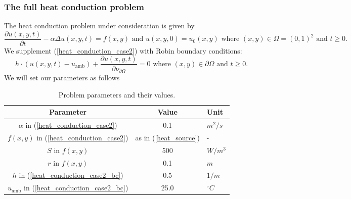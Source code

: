\documentclass[a4paper,11pt]{article}
\theoremstyle{plain} %
\theoremstyle{definition} %
\theoremstyle{remark} %
\theoremstyle{remark}
\def\uTemp{u}
\def\Laplace{\Delta}
\begin{document}
\subsubsection*{The full heat conduction problem}
The heat conduction problem under consideration is given by
\begin{equation} \label{heat_conduction_case2}
\frac{\partial \uTemp (x,y,t) }{\partial t } - \alpha \Laplace \uTemp (x,y,t) = f (x,y) \text{ and } \uTemp (x,y,0) = \uTemp_0 (x,y)  \text{ where } (x,y) \in \Omega = (0,1)^2 \text{ and } t \geq 0 .
\end{equation}
We supplement (\ref{heat_conduction_case2}) with Robin boundary conditions:
\begin{equation} \label{heat_conduction_case2_bc}
h \cdot ( \uTemp (x,y,t) -\uTemp_{\mathrm{amb}} ) + \frac{\partial \uTemp (x,y,t)}{\partial \nu_{\partial \Omega }} = 0 \text{ where } (x,y) \in \partial \Omega \text{ and } t \geq 0 .
\end{equation}
We will set our parameters as follows
\begin{table}[h!] 
\centering
{ \renewcommand{\arraystretch}{1.4}
\begin{tabular}{ccl}
\toprule
\textbf{Parameter} & \textbf{Value} & \textbf{Unit}\\
\midrule
$\alpha $ in (\ref{heat_conduction_case2}) & 0.1 & $m^2/s$\\
$ f(x,y)$ in (\ref{heat_conduction_case2}) & as in (\ref{heat_source}) & -\\
$ S $ in $f(x,y) $ & 500 & $W/m^3$ \\
$ r $ in $ f(x,y) $ & 0.1 & $m$ \\
$ h $ in (\ref{heat_conduction_case2_bc}) & 0.5 & $1/m$ \\
$ \uTemp_{\mathrm{amb}} $ in (\ref{heat_conduction_case2_bc}) & 25.0 & $^\circ C$ \\
\bottomrule
\end{tabular}}
\caption{Problem parameters and their values.}
\label{parameter_values2}
\end{table}
\end{document}
